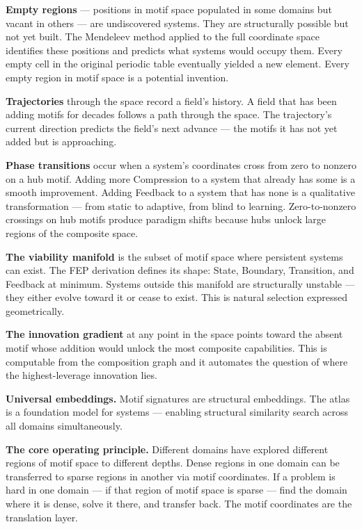 \documentclass[11pt,a4paper]{article}
\begin{document}
\textbf{Empty regions} --- positions in motif space populated in some domains but vacant in others --- are undiscovered systems. They are structurally possible but not yet built. The Mendeleev method applied to the full coordinate space identifies these positions and predicts what systems would occupy them. Every empty cell in the original periodic table eventually yielded a new element. Every empty region in motif space is a potential invention.

\textbf{Trajectories} through the space record a field's history. A field that has been adding motifs for decades follows a path through the space. The trajectory's current direction predicts the field's next advance --- the motifs it has not yet added but is approaching.

\textbf{Phase transitions} occur when a system's coordinates cross from zero to nonzero on a hub motif. Adding more Compression to a system that already has some is a smooth improvement. Adding Feedback to a system that has none is a qualitative transformation --- from static to adaptive, from blind to learning. Zero-to-nonzero crossings on hub motifs produce paradigm shifts because hubs unlock large regions of the composite space.

\textbf{The viability manifold} is the subset of motif space where persistent systems can exist. The FEP derivation defines its shape: State, Boundary, Transition, and Feedback at minimum. Systems outside this manifold are structurally unstable --- they either evolve toward it or cease to exist. This is natural selection expressed geometrically.

\textbf{The innovation gradient} at any point in the space points toward the absent motif whose addition would unlock the most composite capabilities. This is computable from the composition graph and it automates the question of where the highest-leverage innovation lies.

\textbf{Universal embeddings.} Motif signatures are structural embeddings. The atlas is a foundation model for systems --- enabling structural similarity search across all domains simultaneously.

\textbf{The core operating principle.} Different domains have explored different regions of motif space to different depths. Dense regions in one domain can be transferred to sparse regions in another via motif coordinates. If a problem is hard in one domain --- if that region of motif space is sparse --- find the domain where it is dense, solve it there, and transfer back. The motif coordinates are the translation layer.
\end{document}
